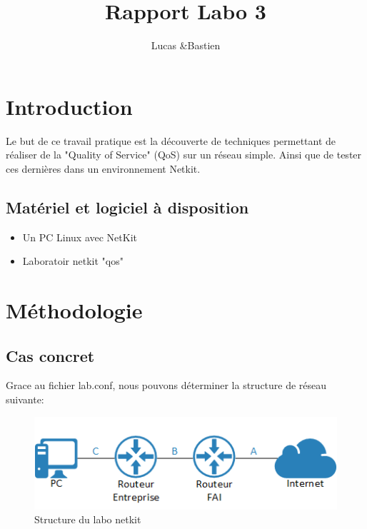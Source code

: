 \documentclass{article}
\title{Rapport Labo 3}
\author{Lucas \bsc{Bulloni} \&Bastien \bsc{Wermeille}}
\begin{document}
\maketitle

 

\section{Introduction}
 Le but de ce travail pratique est la découverte de techniques permettant de réaliser de la "Quality of Service" (QoS) sur un réseau simple. Ainsi que de tester ces dernières dans un environnement Netkit.

\subsection{Matériel et logiciel à disposition}
\begin{itemize}
	\item Un PC Linux avec NetKit
	\item Laboratoir netkit "qos"
\end{itemize}

\section{Méthodologie}

\subsection{Cas concret}
Grace au fichier lab.conf, nous pouvons déterminer la structure de réseau suivante:
\begin{figure}[h]
  \centering
  \includegraphics{./Structure.png}
  \caption{Structure du labo netkit}
  \label{fig:structure}
\end{figure}
\end{document}
